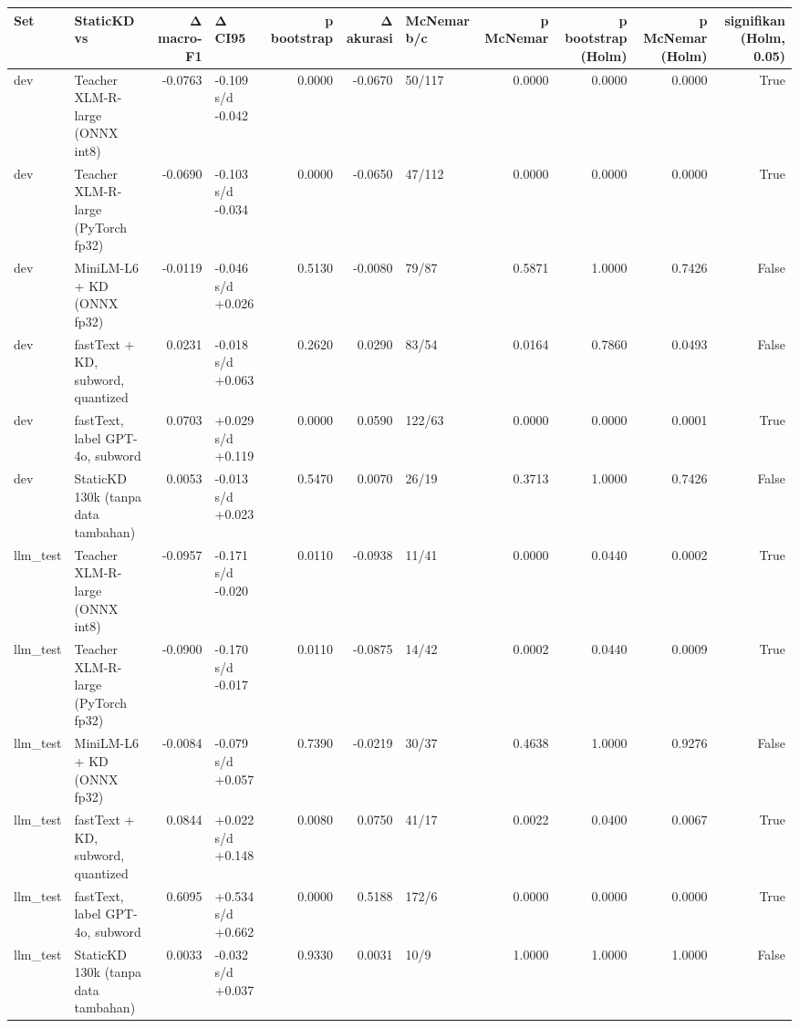 \begin{tabular}{llrlrrlrrrr}
\toprule
Set & StaticKD vs & Δ macro-F1 & Δ CI95 & p bootstrap & Δ akurasi & McNemar b/c & p McNemar & p bootstrap (Holm) & p McNemar (Holm) & signifikan (Holm, 0.05) \\
\midrule
dev & Teacher XLM-R-large (ONNX int8) & -0.0763 & -0.109 s/d -0.042 & 0.0000 & -0.0670 & 50/117 & 0.0000 & 0.0000 & 0.0000 & True \\
dev & Teacher XLM-R-large (PyTorch fp32) & -0.0690 & -0.103 s/d -0.034 & 0.0000 & -0.0650 & 47/112 & 0.0000 & 0.0000 & 0.0000 & True \\
dev & MiniLM-L6 + KD (ONNX fp32) & -0.0119 & -0.046 s/d +0.026 & 0.5130 & -0.0080 & 79/87 & 0.5871 & 1.0000 & 0.7426 & False \\
dev & fastText + KD, subword, quantized & 0.0231 & -0.018 s/d +0.063 & 0.2620 & 0.0290 & 83/54 & 0.0164 & 0.7860 & 0.0493 & False \\
dev & fastText, label GPT-4o, subword & 0.0703 & +0.029 s/d +0.119 & 0.0000 & 0.0590 & 122/63 & 0.0000 & 0.0000 & 0.0001 & True \\
dev & StaticKD 130k (tanpa data tambahan) & 0.0053 & -0.013 s/d +0.023 & 0.5470 & 0.0070 & 26/19 & 0.3713 & 1.0000 & 0.7426 & False \\
llm\_test & Teacher XLM-R-large (ONNX int8) & -0.0957 & -0.171 s/d -0.020 & 0.0110 & -0.0938 & 11/41 & 0.0000 & 0.0440 & 0.0002 & True \\
llm\_test & Teacher XLM-R-large (PyTorch fp32) & -0.0900 & -0.170 s/d -0.017 & 0.0110 & -0.0875 & 14/42 & 0.0002 & 0.0440 & 0.0009 & True \\
llm\_test & MiniLM-L6 + KD (ONNX fp32) & -0.0084 & -0.079 s/d +0.057 & 0.7390 & -0.0219 & 30/37 & 0.4638 & 1.0000 & 0.9276 & False \\
llm\_test & fastText + KD, subword, quantized & 0.0844 & +0.022 s/d +0.148 & 0.0080 & 0.0750 & 41/17 & 0.0022 & 0.0400 & 0.0067 & True \\
llm\_test & fastText, label GPT-4o, subword & 0.6095 & +0.534 s/d +0.662 & 0.0000 & 0.5188 & 172/6 & 0.0000 & 0.0000 & 0.0000 & True \\
llm\_test & StaticKD 130k (tanpa data tambahan) & 0.0033 & -0.032 s/d +0.037 & 0.9330 & 0.0031 & 10/9 & 1.0000 & 1.0000 & 1.0000 & False \\
\bottomrule
\end{tabular}
